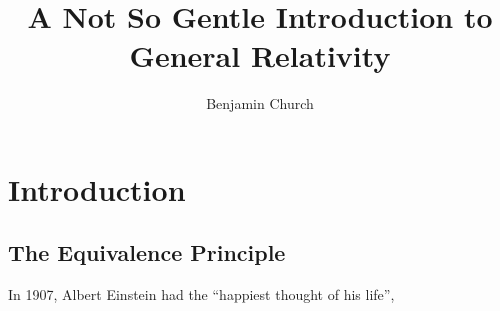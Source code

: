 \documentclass[11pt, a4paper]{article}
\begin{document}
\author{Benjamin Church}
\title{\Huge A Not So Gentle Introduction to General Relativity}

\newcommand{\R}{\mathbb{R}}
\renewcommand{\d}[1]{\mathrm{d}#1}
\newcommand{\dn}[2]{\mathrm{d}^{#1} #2}
\newcommand{\deriv}[2]{\frac{\d{#1}}{\d{#2}}}
\newcommand{\pderiv}[2]{\frac{\partial{#1}}{\partial{#2}}}
\newcommand{\nderiv}[3]{\frac{\d{^{#1} #2}}{\d{#3}^{#1}}}
\newcommand{\cderiv}[3]{\left(\frac{\partial{#1}}{\partial{#2}}\right)_{#3}}
\newcommand{\cobase}[1]{\vec{e}^{\, #1}}

\theoremstyle{theorem}
\newtheorem{theorem}{Theorem}[section]
\newtheorem{lemma}[theorem]{Lemma}
\newtheorem{corollary}[theorem]{Corollary}

\theoremstyle{definition}
\newtheorem*{problem}{Problem}

\theoremstyle{definition}
\newtheorem{example}{Example}[section]

\theoremstyle{definition}
\newtheorem{definition}{Definition}[section]

\theoremstyle{remark}
\newtheorem{remark}{Remark}[subsection]


\maketitle
\tableofcontents
\newpage

\section{Introduction}

\subsection{The Equivalence Principle}

In 1907, Albert Einstein had the ``happiest thought of his life'',
\end{document}
